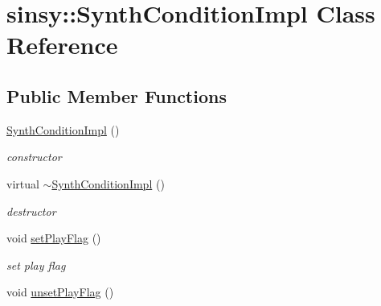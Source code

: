 \hypertarget{classsinsy_1_1SynthConditionImpl}{\section{sinsy\-:\-:\-Synth\-Condition\-Impl \-Class \-Reference}
\label{classsinsy_1_1SynthConditionImpl}
}
\subsection*{\-Public \-Member \-Functions}
\begin{DoxyCompactItemize}
\item 
\hypertarget{classsinsy_1_1SynthConditionImpl_aa97e00c31046727c71f0030412275b06}{\hyperlink{classsinsy_1_1SynthConditionImpl_aa97e00c31046727c71f0030412275b06}{\-Synth\-Condition\-Impl} ()}\label{classsinsy_1_1SynthConditionImpl_aa97e00c31046727c71f0030412275b06}

\begin{DoxyCompactList}\small\item\em constructor \end{DoxyCompactList}\item 
\hypertarget{classsinsy_1_1SynthConditionImpl_a75fad8152cafb1fc5dd529a9516d9051}{virtual \hyperlink{classsinsy_1_1SynthConditionImpl_a75fad8152cafb1fc5dd529a9516d9051}{$\sim$\-Synth\-Condition\-Impl} ()}\label{classsinsy_1_1SynthConditionImpl_a75fad8152cafb1fc5dd529a9516d9051}

\begin{DoxyCompactList}\small\item\em destructor \end{DoxyCompactList}\item 
\hypertarget{classsinsy_1_1SynthConditionImpl_a49863ab67d09dd96028abc325bcad3d4}{void \hyperlink{classsinsy_1_1SynthConditionImpl_a49863ab67d09dd96028abc325bcad3d4}{set\-Play\-Flag} ()}\label{classsinsy_1_1SynthConditionImpl_a49863ab67d09dd96028abc325bcad3d4}

\begin{DoxyCompactList}\small\item\em set play flag \end{DoxyCompactList}\item 
\hypertarget{classsinsy_1_1SynthConditionImpl_af36b8eb252a96d545b6fbdd5da5d6144}{void \hyperlink{classsinsy_1_1SynthConditionImpl_af36b8eb252a96d545b6fbdd5da5d6144}{unset\-Play\-Flag} ()}\label{classsinsy_1_1SynthConditionImpl_af36b8eb252a96d545b6fbdd5da5d6144}


\end{DoxyCompactItemize}
